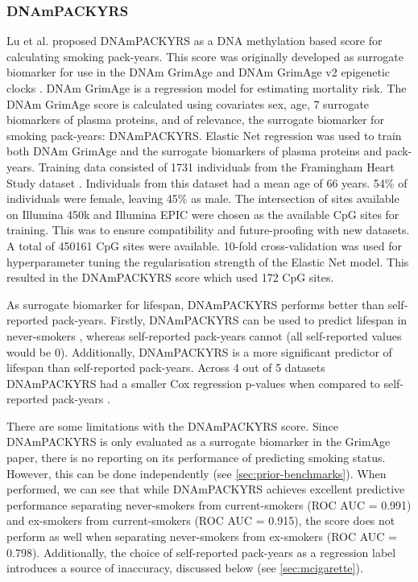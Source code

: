 \documentclass{article}
\begin{document}
\subsubsection{DNAmPACKYRS} \label{sec:dnampackyrs}
Lu et al. \cite{lu2019dna} proposed DNAmPACKYRS as a DNA methylation based score for calculating smoking pack-years. This score was originally developed as surrogate biomarker for use in the DNAm GrimAge and DNAm GrimAge v2 epigenetic clocks \cite{lu2019dna,lu2022dna}. DNAm GrimAge is a regression model for estimating mortality risk. The DNAm GrimAge score is calculated using covariates sex, age, 7 surrogate biomarkers of plasma proteins, and of relevance, the surrogate biomarker for smoking pack-years: DNAmPACKYRS. Elastic Net regression was used to train both DNAm GrimAge and the surrogate biomarkers of plasma proteins and pack-years. Training data consisted of 1731 individuals from the Framingham Heart Study dataset \cite{doi:10.2105/AJPH.41.3.279}. Individuals from this dataset had a mean age of 66 years. 54\% of individuals were female, leaving 45\% as male. The intersection of sites available on Illumina 450k and Illumina EPIC were chosen as the available CpG sites for training. This was to ensure compatibility and future-proofing with new datasets. A total of \num{450161} CpG sites were available. 10-fold cross-validation was used for hyperparameter tuning the regularisation strength of the Elastic Net model. This resulted in the DNAmPACKYRS score which used 172 CpG sites.

As surrogate biomarker for lifespan, DNAmPACKYRS performs better than self-reported pack-years. Firstly, DNAmPACKYRS can be used to predict lifespan in never-smokers \cite{lu2019dna}, whereas self-reported pack-years cannot (all self-reported values would be 0). Additionally, DNAmPACKYRS is a more significant predictor of lifespan than self-reported pack-years. Across 4 out of 5 datasets DNAmPACKYRS had a smaller Cox regression p-values when compared to self-reported pack-years \cite{lu2019dna}.

There are some limitations with the DNAmPACKYRS score. Since DNAmPACKYRS is only evaluated as a surrogate biomarker in the GrimAge paper, there is no reporting on its performance of predicting smoking status. However, this can be done independently (see \ref{sec:prior-benchmarks}). When performed, we can see that while DNAmPACKYRS achieves excellent predictive performance separating never-smokers from current-smokers (ROC AUC = 0.991) and ex-smokers from current-smokers (ROC AUC = 0.915), the score does not perform as well when separating never-smokers from ex-smokers (ROC AUC = 0.798). Additionally, the choice of self-reported pack-years as a regression label introduces a source of inaccuracy, discussed below (see \ref{sec:mcigarette}).
\end{document}
